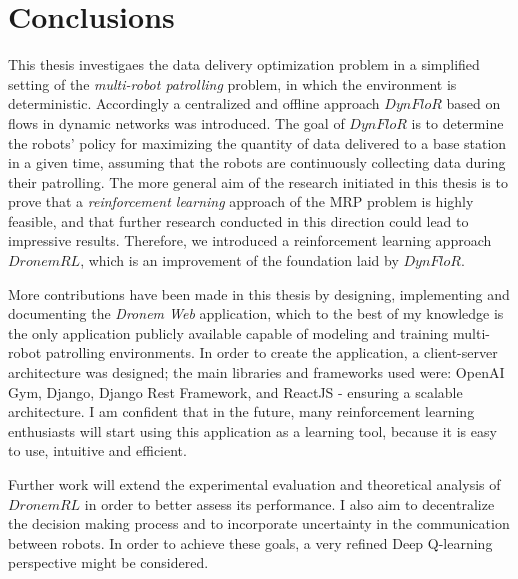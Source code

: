 \chapter*{Conclusions}
\label{conclus}


This thesis investigaes the data delivery optimization problem in a simplified setting  of the \emph{multi-robot patrolling} problem, in which the environment is deterministic. Accordingly a centralized and offline approach $DynFloR$ based on flows in dynamic networks was introduced. The goal of $DynFloR$ is to determine the robots' policy for maximizing  the quantity of data delivered to a base station in a given time, assuming that the robots are continuously collecting data during their patrolling. The more general aim of the research initiated in this thesis is to prove that a \emph{reinforcement learning} approach of the MRP problem is highly feasible, and that further research conducted in this direction could lead to impressive results. Therefore, we introduced a reinforcement learning approach $DronemRL$, which is an improvement of the foundation laid by $DynFloR$.

More contributions have been made in this thesis by designing, implementing and documenting the \emph{Dronem Web} application, which to the best of my knowledge is the only application publicly available capable of modeling and training multi-robot patrolling environments. In order to create the application, a client-server architecture was designed;  the main libraries and frameworks used were:  OpenAI Gym, Django, Django Rest Framework, and ReactJS - ensuring a scalable architecture. I am confident that in the future, many reinforcement learning enthusiasts  will start using this application as a learning tool, because it is easy to use, intuitive and efficient. 

Further work will extend the experimental evaluation and theoretical analysis of $DronemRL$ in order to better assess its performance. I also aim to decentralize the decision making process and to incorporate uncertainty in the communication between robots. In order to achieve these goals, a very refined Deep Q-learning perspective might be considered. 

